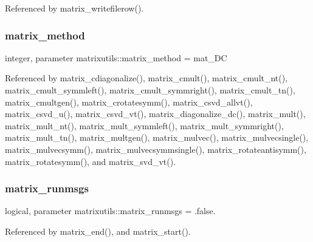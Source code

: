 Referenced by matrix\+\_\+writefilerow().

\mbox{\label{namespacematrixutils_a7a9a7ea3dbe2beeff5a5f32de5f21dc3}} 
\subsubsection{\texorpdfstring{matrix\+\_\+method}{matrix\_method}}
{\footnotesize\ttfamily integer, parameter matrixutils\+::matrix\+\_\+method = mat\+\_\+\+DC}



Referenced by matrix\+\_\+cdiagonalize(), matrix\+\_\+cmult(), matrix\+\_\+cmult\+\_\+nt(), matrix\+\_\+cmult\+\_\+symmleft(), matrix\+\_\+cmult\+\_\+symmright(), matrix\+\_\+cmult\+\_\+tn(), matrix\+\_\+cmultgen(), matrix\+\_\+crotatesymm(), matrix\+\_\+csvd\+\_\+allvt(), matrix\+\_\+csvd\+\_\+u(), matrix\+\_\+csvd\+\_\+vt(), matrix\+\_\+diagonalize\+\_\+dc(), matrix\+\_\+mult(), matrix\+\_\+mult\+\_\+nt(), matrix\+\_\+mult\+\_\+symmleft(), matrix\+\_\+mult\+\_\+symmright(), matrix\+\_\+mult\+\_\+tn(), matrix\+\_\+multgen(), matrix\+\_\+mulvec(), matrix\+\_\+mulvecsingle(), matrix\+\_\+mulvecsymm(), matrix\+\_\+mulvecsymmsingle(), matrix\+\_\+rotateantisymm(), matrix\+\_\+rotatesymm(), and matrix\+\_\+svd\+\_\+vt().

\mbox{\label{namespacematrixutils_a5c4836d18b8e1233dd130c5dc15e30fd}} 
\subsubsection{\texorpdfstring{matrix\+\_\+runmsgs}{matrix\_runmsgs}}
{\footnotesize\ttfamily logical, parameter matrixutils\+::matrix\+\_\+runmsgs = .false.}



Referenced by matrix\+\_\+end(), and matrix\+\_\+start().

\mbox{\label{namespacematrixutils_ab55e44d02787c32fab67dd16c8ebddef}} 
